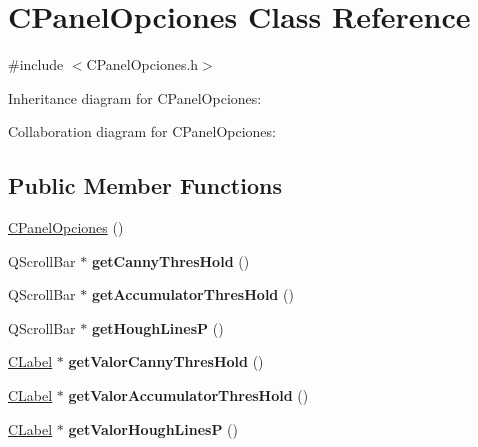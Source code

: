 \hypertarget{classCPanelOpciones}{}\section{C\+Panel\+Opciones Class Reference}
\label{classCPanelOpciones}


{\ttfamily \#include $<$C\+Panel\+Opciones.\+h$>$}



Inheritance diagram for C\+Panel\+Opciones\+:


Collaboration diagram for C\+Panel\+Opciones\+:
\subsection*{Public Member Functions}
\begin{DoxyCompactItemize}
\item 
\hyperlink{classCPanelOpciones_ad187a964b9ac72e6571ca699035195a3}{C\+Panel\+Opciones} ()
\item 
Q\+Scroll\+Bar $\ast$ {\bfseries get\+Canny\+Thres\+Hold} ()\hypertarget{classCPanelOpciones_a69b8584e61b0fbd7a86c9b4b1af4fd60}{}\label{classCPanelOpciones_a69b8584e61b0fbd7a86c9b4b1af4fd60}

\item 
Q\+Scroll\+Bar $\ast$ {\bfseries get\+Accumulator\+Thres\+Hold} ()\hypertarget{classCPanelOpciones_adefbced180846a9e7443aa6063ea39f8}{}\label{classCPanelOpciones_adefbced180846a9e7443aa6063ea39f8}

\item 
Q\+Scroll\+Bar $\ast$ {\bfseries get\+Hough\+LinesP} ()\hypertarget{classCPanelOpciones_a26734902c1b8c353c83c6b3530be3c47}{}\label{classCPanelOpciones_a26734902c1b8c353c83c6b3530be3c47}

\item 
\hyperlink{classCLabel}{C\+Label} $\ast$ {\bfseries get\+Valor\+Canny\+Thres\+Hold} ()\hypertarget{classCPanelOpciones_a65fee0477e988937ea93176f04657388}{}\label{classCPanelOpciones_a65fee0477e988937ea93176f04657388}

\item 
\hyperlink{classCLabel}{C\+Label} $\ast$ {\bfseries get\+Valor\+Accumulator\+Thres\+Hold} ()\hypertarget{classCPanelOpciones_a0f051efb1549353b79966471bc6b656f}{}\label{classCPanelOpciones_a0f051efb1549353b79966471bc6b656f}

\item 
\hyperlink{classCLabel}{C\+Label} $\ast$ {\bfseries get\+Valor\+Hough\+LinesP} ()\hypertarget{classCPanelOpciones_aae4983463e8d5e2d07fc93bee488af0b}{}\label{classCPanelOpciones_aae4983463e8d5e2d07fc93bee488af0b}

\end{DoxyCompactItemize}


